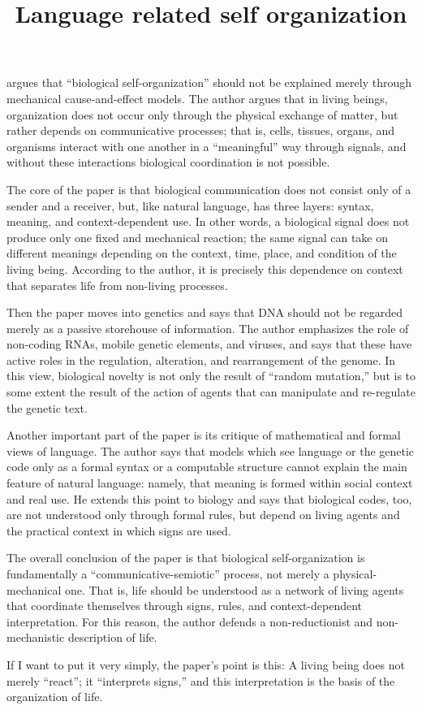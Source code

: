 \documentclass[a4paper]{article}
\title{Language related self organization}
\date{}
\begin{document}
    \maketitle
    \cite{witzany-2014-biological-self-organization} argues that “biological self-organization” should not be explained merely through mechanical cause-and-effect models. The author argues that in living beings, organization does not occur only through the physical exchange of matter, but rather depends on communicative processes; that is, cells, tissues, organs, and organisms interact with one another in a “meaningful” way through signals, and without these interactions biological coordination is not possible.
    
    The core of the paper is that biological communication does not consist only of a sender and a receiver, but, like natural language, has three layers: syntax, meaning, and context-dependent use. In other words, a biological signal does not produce only one fixed and mechanical reaction; the same signal can take on different meanings depending on the context, time, place, and condition of the living being. According to the author, it is precisely this dependence on context that separates life from non-living processes.
    
    Then the paper moves into genetics and says that DNA should not be regarded merely as a passive storehouse of information. The author emphasizes the role of non-coding RNAs, mobile genetic elements, and viruses, and says that these have active roles in the regulation, alteration, and rearrangement of the genome. In this view, biological novelty is not only the result of “random mutation,” but is to some extent the result of the action of agents that can manipulate and re-regulate the genetic text.
    
    Another important part of the paper is its critique of mathematical and formal views of language. The author says that models which see language or the genetic code only as a formal syntax or a computable structure cannot explain the main feature of natural language: namely, that meaning is formed within social context and real use. He extends this point to biology and says that biological codes, too, are not understood only through formal rules, but depend on living agents and the practical context in which signs are used.
    
    The overall conclusion of the paper is that biological self-organization is fundamentally a “communicative-semiotic” process, not merely a physical-mechanical one. That is, life should be understood as a network of living agents that coordinate themselves through signs, rules, and context-dependent interpretation. For this reason, the author defends a non-reductionist and non-mechanistic description of life.
    
    If I want to put it very simply, the paper’s point is this:
    A living being does not merely “react”; it “interprets signs,” and this interpretation is the basis of the organization of life.
    
    
\end{document}
